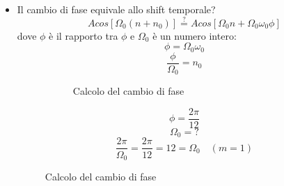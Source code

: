 \documentclass[a4paper]{article}
\begin{document}
\begin{itemize}
  \item Il cambio di fase equivale allo shift temporale?
    \[
      A cos[\Omega_0 (n + n_0)] \stackrel{?}{=} A cos[\Omega_0 n + \Omega_0 \omega_0 \phi]
    \] 
    dove \( \phi \) è il rapporto tra \( \phi \) e \( \Omega_0 \) è un numero intero:
    \[
    \phi = \Omega_0 \omega_0
    \] 
    \[
    \frac{\phi}{\Omega_0} = n_0
    \] 
    \begin{figure}[H]
      \begin{example}
        \begin{figure}[H]
          \centering
          \caption{Calcolo del cambio di fase}
        \end{figure}
        \[
          \phi = \frac{2\pi}{12}
        \] 
        \[
        \Omega_0 = ?
        \] 
        \[
          \frac{2\pi}{\Omega_0} = \frac{2\pi}{12} = 12 = \Omega_0 \quad (m = 1)
        \] 
      \end{example}
    \end{figure}
\end{itemize}
\end{document}

